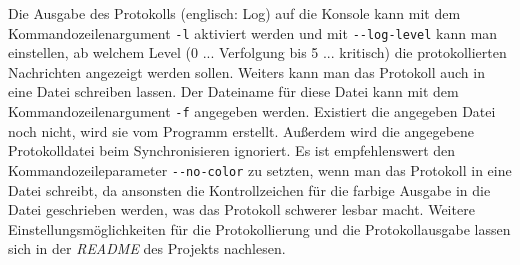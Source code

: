 Die Ausgabe des Protokolls (englisch: Log) auf die Konsole kann mit dem Kommandozeilenargument \verb|-l| aktiviert werden und mit \verb|--log-level| kann
man einstellen, ab welchem Level (0 ... Verfolgung bis 5 ... kritisch) die protokollierten Nachrichten angezeigt werden sollen. Weiters kann man das 
Protokoll auch in eine Datei schreiben lassen. Der Dateiname für diese Datei kann mit dem Kommandozeilenargument \verb|-f| angegeben werden.
Existiert die angegeben Datei noch nicht, wird sie vom Programm erstellt. Außerdem wird die angegebene Protokolldatei beim Synchronisieren ignoriert.
Es ist empfehlenswert den Kommandozeileparameter \verb|--no-color| zu setzten, wenn man das Protokoll in eine Datei schreibt, da ansonsten
die Kontrollzeichen für die farbige Ausgabe in die Datei geschrieben werden, was das Protokoll schwerer lesbar macht.
Weitere Einstellungsmöglichkeiten für die Protokollierung und die Protokollausgabe lassen sich in der \textit{README} des Projekts nachlesen.
